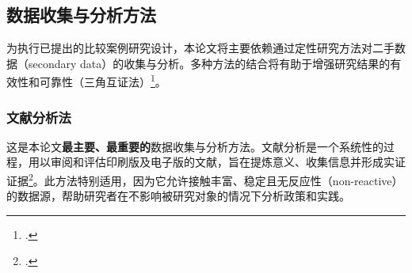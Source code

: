 

\subsection{数据收集与分析方法}
\label{subsec:phuong_phap_cu_the}

为执行已提出的比较案例研究设计，本论文将主要依赖通过定性研究方法对二手数据（secondary data）的收集与分析。多种方法的结合将有助于增强研究结果的有效性和可靠性（三角互证法）\footcite{DenzinLincoln2011}。

\subsubsection{文献分析法}
\label{subsubsec:phan_tich_tai_lieu}

这是本论文\textbf{最主要、最重要的}数据收集与分析方法。文献分析是一个系统性的过程，用以审阅和评估印刷版及电子版的文献，旨在提炼意义、收集信息并形成实证证据\footcite{Bowen2009}。此方法特别适用，因为它允许接触丰富、稳定且无反应性（non-reactive）的数据源，帮助研究者在不影响被研究对象的情况下分析政策和实践。

